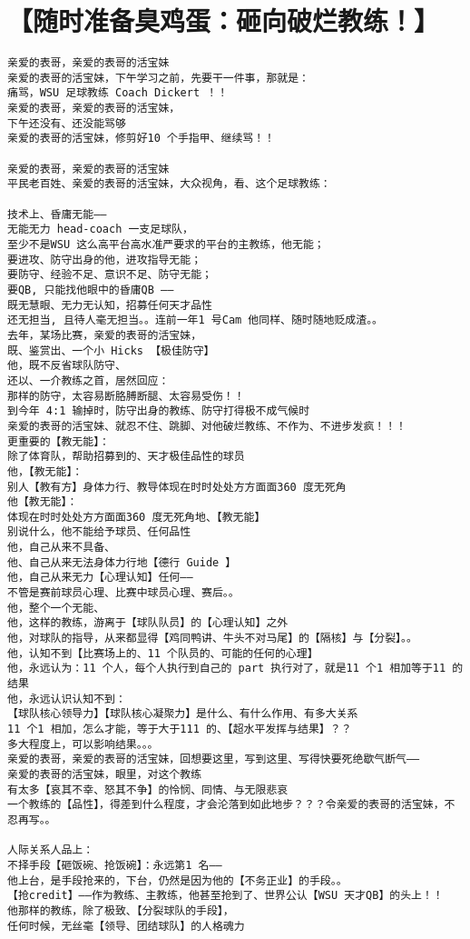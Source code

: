 \documentclass[9pt, b5paper]{article}
\begin{document}
\section{【随时准备臭鸡蛋：砸向破烂教练！】}
\label{sec-5}
\begin{verbatim}
亲爱的表哥，亲爱的表哥的活宝妹
亲爱的表哥的活宝妹，下午学习之前，先要干一件事，那就是：
痛骂，WSU 足球教练 Coach Dickert ！！
亲爱的表哥，亲爱的表哥的活宝妹，
下午还没有、还没能骂够
亲爱的表哥的活宝妹，修剪好10 个手指甲、继续骂！！

亲爱的表哥，亲爱的表哥的活宝妹
平民老百姓、亲爱的表哥的活宝妹，大众视角，看、这个足球教练：

技术上、昏庸无能——
无能无力 head-coach 一支足球队，
至少不是WSU 这么高平台高水准严要求的平台的主教练，他无能；
要进攻、防守出身的他，进攻指导无能；
要防守、经验不足、意识不足、防守无能；
要QB, 只能找他眼中的昏庸QB ——
既无慧眼、无力无认知，招募任何天才品性
还无担当, 且待人毫无担当。。连前一年1 号Cam 他同样、随时随地贬成渣。。
去年，某场比赛，亲爱的表哥的活宝妹，
既、鉴赏出、一个小 Hicks 【极佳防守】
他，既不反省球队防守、
还以、一介教练之首，居然回应：
那样的防守，太容易断胳膊断腿、太容易受伤！！
到今年 4:1 输掉时，防守出身的教练、防守打得极不成气候时
亲爱的表哥的活宝妹、就忍不住、跳脚、对他破烂教练、不作为、不进步发疯！！！
更重要的【教无能】：
除了体育队，帮助招募到的、天才极佳品性的球员
他，【教无能】：
别人【教有方】身体力行、教导体现在时时处处方方面面360 度无死角
他【教无能】：
体现在时时处处方方面面360 度无死角地、【教无能】
别说什么，他不能给予球员、任何品性
他，自己从来不具备、
他、自己从来无法身体力行地【德行 Guide 】
他，自己从来无力【心理认知】任何——
不管是赛前球员心理、比赛中球员心理、赛后。。
他，整个一个无能、
他，这样的教练，游离于【球队队员】的【心理认知】之外
他，对球队的指导，从来都显得【鸡同鸭讲、牛头不对马尾】的【隔核】与【分裂】。。
他，认知不到【比赛场上的、11 个队员的、可能的任何的心理】
他，永远认为：11 个人，每个人执行到自己的 part 执行对了，就是11 个1 相加等于11 的结果
他，永远认识认知不到：
【球队核心领导力】【球队核心凝聚力】是什么、有什么作用、有多大关系
11 个1 相加，怎么才能，等于大于111 的、【超水平发挥与结果】？？
多大程度上，可以影响结果。。。
亲爱的表哥，亲爱的表哥的活宝妹，回想要这里，写到这里、写得快要死绝歇气断气——
亲爱的表哥的活宝妹，眼里，对这个教练
有太多【哀其不幸、怒其不争】的怜悯、同情、与无限悲哀
一个教练的【品性】，得差到什么程度，才会沦落到如此地步？？？令亲爱的表哥的活宝妹，不忍再写。。

人际关系人品上：
不择手段【砸饭碗、抢饭碗】：永远第1 名——
他上台，是手段抢来的，下台，仍然是因为他的【不务正业】的手段。。
【抢credit】——作为教练、主教练，他甚至抢到了、世界公认【WSU 天才QB】的头上！！
他那样的教练，除了极致、【分裂球队的手段】，
任何时候，无丝毫【领导、团结球队】的人格魂力


\end{verbatim}
\end{document}
